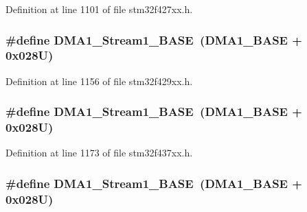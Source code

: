 Definition at line 1101 of file stm32f427xx.\+h.

\subsubsection[{\texorpdfstring{D\+M\+A1\+\_\+\+Stream1\+\_\+\+B\+A\+SE}{DMA1_Stream1_BASE}}]{\setlength{\rightskip}{0pt plus 5cm}\#define D\+M\+A1\+\_\+\+Stream1\+\_\+\+B\+A\+SE~({\bf D\+M\+A1\+\_\+\+B\+A\+SE} + 0x028\+U)}\hypertarget{group___peripheral__memory__map_ga5b4152cef577e37eccc9311d8bdbf3c2}{}\label{group___peripheral__memory__map_ga5b4152cef577e37eccc9311d8bdbf3c2}


Definition at line 1156 of file stm32f429xx.\+h.

\subsubsection[{\texorpdfstring{D\+M\+A1\+\_\+\+Stream1\+\_\+\+B\+A\+SE}{DMA1_Stream1_BASE}}]{\setlength{\rightskip}{0pt plus 5cm}\#define D\+M\+A1\+\_\+\+Stream1\+\_\+\+B\+A\+SE~({\bf D\+M\+A1\+\_\+\+B\+A\+SE} + 0x028\+U)}\hypertarget{group___peripheral__memory__map_ga5b4152cef577e37eccc9311d8bdbf3c2}{}\label{group___peripheral__memory__map_ga5b4152cef577e37eccc9311d8bdbf3c2}


Definition at line 1173 of file stm32f437xx.\+h.

\subsubsection[{\texorpdfstring{D\+M\+A1\+\_\+\+Stream1\+\_\+\+B\+A\+SE}{DMA1_Stream1_BASE}}]{\setlength{\rightskip}{0pt plus 5cm}\#define D\+M\+A1\+\_\+\+Stream1\+\_\+\+B\+A\+SE~({\bf D\+M\+A1\+\_\+\+B\+A\+SE} + 0x028\+U)}\hypertarget{group___peripheral__memory__map_ga5b4152cef577e37eccc9311d8bdbf3c2}{}\label{group___peripheral__memory__map_ga5b4152cef577e37eccc9311d8bdbf3c2}


